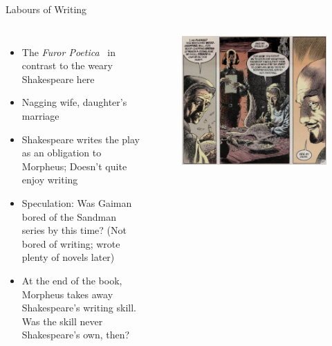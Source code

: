 \documentclass{beamer}
\begin{document}
  \begin{frame}{Labours of Writing}
    \begin{columns}[c]
      \begin{itemize}
      \item The \emph{Furor Poetica}~\cite{gaimanmnd} in contrast to the weary Shakespeare here
      \item Nagging wife, daughter's marriage
      \item Shakespeare writes the play as an obligation to Morpheus; Doesn't quite enjoy writing
      \item Speculation: Was Gaiman bored of the Sandman series by this time? (Not bored of writing; wrote plenty of novels later)
      \item At the end of the book, Morpheus takes away Shakespeare's writing skill. Was the skill never Shakespeare's own, then?
      \end{itemize}
      \begin{figure}[htp]
        \begin{center}
          \centering
          \includegraphics[scale=0.2]{nagging.jpg}
        \end{center}
      \end{figure}
      

\end{columns}
\end{frame}
\end{document}
